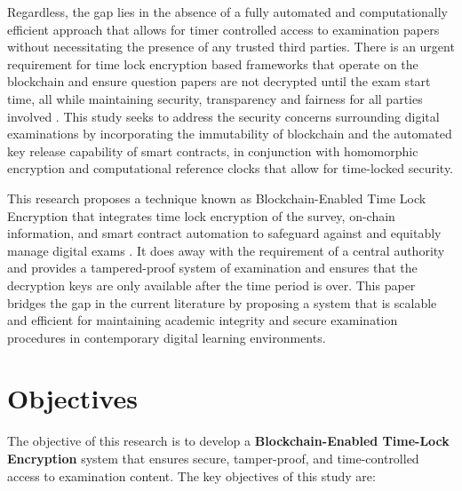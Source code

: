 \documentclass[12pt,a4paper]{article}
\begin{document}
Regardless, the gap lies in the absence of a fully automated and computationally efficient approach that allows for timer controlled access to examination papers without necessitating the presence of any trusted third parties. There is an urgent requirement for time lock encryption based frameworks that operate on the blockchain and ensure question papers are not decrypted until the exam start time, all while maintaining security, transparency and fairness for all parties involved \cite{8656959}. This study seeks to address the security concerns surrounding digital examinations by incorporating the immutability of blockchain and the automated key release capability of smart contracts, in conjunction with homomorphic encryption and computational reference clocks that allow for time-locked security.

This research proposes a technique known as Blockchain-Enabled Time Lock Encryption that integrates time lock encryption of the survey, on-chain information, and smart contract automation to safeguard against and equitably manage digital exams \cite{zeroknowledgeproof}. It does away with the requirement of a central authority and provides a tampered-proof system of examination and ensures that the decryption keys are only available after the time period is over. This paper bridges the gap in the current literature by proposing a system that is scalable and efficient for maintaining academic integrity and secure examination procedures in contemporary digital learning environments.



\newpage
\section{Objectives}
The objective of this research is to develop a \textbf{Blockchain-Enabled Time-Lock Encryption} system that ensures secure, tamper-proof, and time-controlled access to examination content. The key objectives of this study are:
\end{document}
